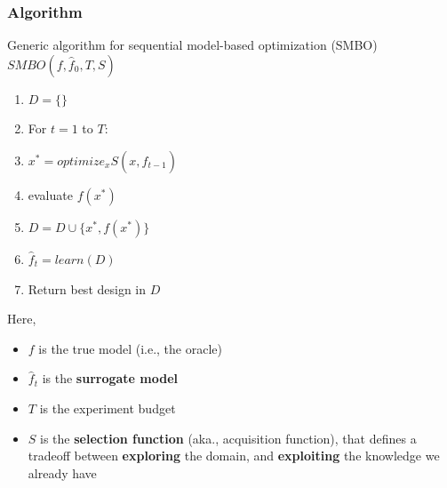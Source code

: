 \documentclass[10pt]{article}
\begin{document}
\subsubsection*{Algorithm}
Generic algorithm for sequential model-based optimization (SMBO)
$SMBO(f, \hat{f}_0, T, S)$
\begin{enumerate}
	\item $D = \{\}$
	\item For $t = 1$ to $T$:
	\item \quad $x^* = optimize_x S(x, \hat{f}_{t - 1})$
	\item \quad evaluate $f(x^*)$
	\item \quad $D = D \cup \{x^*, f(x^*)\}$
	\item \quad $\hat{f}_t = learn(D)$
	\item Return best design in $D$
\end{enumerate}
Here,
\begin{itemize}
	\item $f$ is the true model (i.e., the oracle)
	\item $\hat{f}_t$ is the \textbf{surrogate model}
	\item $T$ is the experiment budget
	\item $S$ is the \textbf{selection function} (aka., acquisition function), that defines a tradeoff between \textbf{exploring} the domain, and \textbf{exploiting} the knowledge we already have
\end{itemize}
\end{document}
